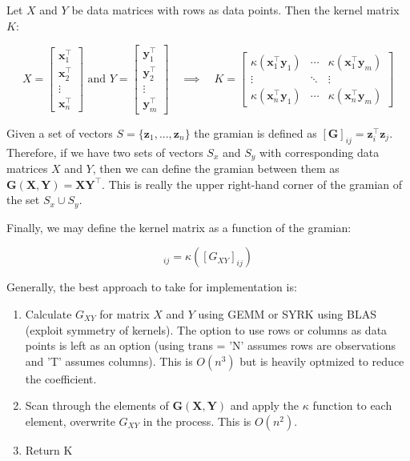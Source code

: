 \documentclass[12pt, a4paper]{article}
\begin{document}
Let $X$ and $Y$ be data matrices with rows as data points. Then the kernel matrix $K$:

\begin{equation*}
    X = \left[
        \begin{array}{c}
            \mathbf{x}_1^{\intercal} \\
            \mathbf{x}_2^{\intercal} \\
            \vdots \\
            \mathbf{x}_n^{\intercal}
        \end{array} 
    \right]
    \text{ and }
    Y = \left[
        \begin{array}{c}
            \mathbf{y}_1^{\intercal} \\
            \mathbf{y}_2^{\intercal} \\
            \vdots \\
            \mathbf{y}_m^{\intercal}
        \end{array} 
    \right]
    \quad \implies \quad
    K = \left[
        \begin{array}{ccc}
            \kappa(\mathbf{x}_1^{\intercal} \mathbf{y}_1) & \cdots & \kappa(\mathbf{x}_1^{\intercal} \mathbf{y}_m) \\
            \vdots & \ddots & \vdots \\
            \kappa(\mathbf{x}_n^{\intercal} \mathbf{y}_1) & \cdots & \kappa(\mathbf{x}_n^{\intercal} \mathbf{y}_m)
        \end{array} 
    \right]
\end{equation*}

Given a set of vectors $S = \{\mathbf{z}_1, ..., \mathbf{z}_n \}$ the gramian is defined as $[\mathbf{G}]_{ij} = \mathbf{z}_i^\intercal \mathbf{z}_j$. Therefore, if we have two sets of vectors $S_x$ and $S_y$ with corresponding data matrices $X$ and $Y$, then we can define the gramian between them as $\mathbf{G}(\mathbf{X}, \mathbf{Y}) = \mathbf{X}\mathbf{Y}^\intercal$. This is really the upper right-hand corner of the gramian of the set $S_x \cup S_y$. 

Finally, we may define the kernel matrix as a function of the gramian:

\begin{equation*}
    [K]_{ij} = \kappa\left([G_{XY}]_{ij}\right)
\end{equation*}

Generally, the best approach to take for implementation is:

\begin{enumerate}
    \item Calculate $G_{XY}$ for matrix $X$ and $Y$ using GEMM or SYRK using BLAS (exploit symmetry of kernels). The option to use rows or columns as data points is left as an option (using trans = 'N' assumes rows are observations and 'T' assumes columns). This is $O(n^3)$ but is heavily optmized to reduce the coefficient.
    \item Scan through the elements of $\mathbf{G}(\mathbf{X},\mathbf{Y})$ and apply the $\kappa$ function to each element, overwrite $G_{XY}$ in the process. This is $O(n^2)$.
    \item Return K
\end{enumerate}
\end{document}
